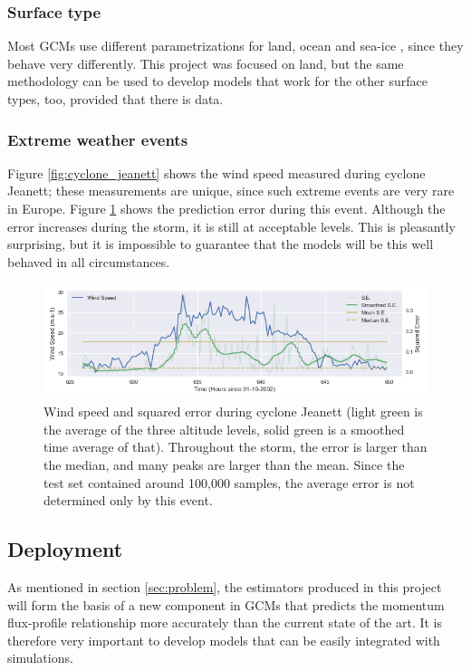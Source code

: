\documentclass[a4paper,11pt]{kth-mag}
\begin{document}
\subsubsection{Surface type} Most GCMs use different parametrizations for land, ocean and sea-ice \citep{gfdl_am2,gfdl_am3,hadcm3}, since they behave very differently. This project was focused on land, but the same methodology can be used to develop models that work for the other surface types, too, provided that there is data.

\subsubsection{Extreme weather events} Figure \ref{fig:cyclone_jeanett} shows the wind speed measured during cyclone Jeanett; these measurements are unique, since such extreme events are very rare in Europe. Figure \ref{fig:jeanett_error} shows the prediction error during this event. Although the error increases during the storm, it is still at acceptable levels. This is pleasantly surprising, but it is impossible to guarantee that the models will be this well behaved in all circumstances.

\begin{figure}
    \centering
    \includegraphics[width=\textwidth]{images/jeanett_error}
    \caption{Wind speed and squared error during cyclone Jeanett (light green is the average of the three altitude levels, solid green is a smoothed time average of that). Throughout the storm, the error is larger than the median, and many peaks are larger than the mean. Since the test set contained around 100,000 samples, the average error is not determined only by this event.}
    \label{fig:jeanett_error}
\end{figure}


\subsection{Deployment}
As mentioned in section \ref{sec:problem}, the estimators produced in this project will form the basis of a new component in GCMs that predicts the momentum flux-profile relationship more accurately than the current state of the art. It is therefore very important to develop models that can be easily integrated with simulations.
\end{document}

